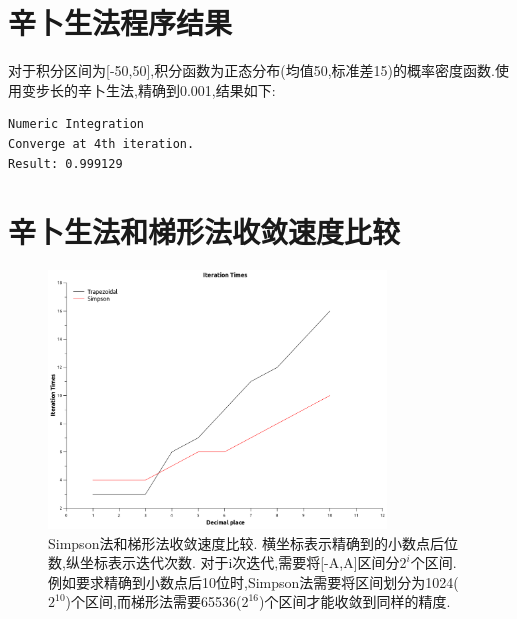 \documentclass[10pt,a4paper]{article}
\begin{document}
\section{辛卜生法程序结果}
对于积分区间为[-50,50],积分函数为正态分布(均值50,标准差15)的概率密度函数.使用变步长的辛卜生法,精确到0.001,结果如下:
\begin{verbatim}
Numeric Integration
Converge at 4th iteration.
Result: 0.999129
\end{verbatim}

\section{辛卜生法和梯形法收敛速度比较}
\begin{figure}[H]
\centering
\includegraphics[width=0.8\textwidth]{../result/Graph1.png}
\caption{Simpson法和梯形法收敛速度比较. 横坐标表示精确到的小数点后位数,纵坐标表示迭代次数. 对于i次迭代,需要将[-A,A]区间分$2^i$个区间. 例如要求精确到小数点后10位时,Simpson法需要将区间划分为1024($2^{10}$)个区间,而梯形法需要65536($2^{16}$)个区间才能收敛到同样的精度.}
\end{figure}
\end{document}
